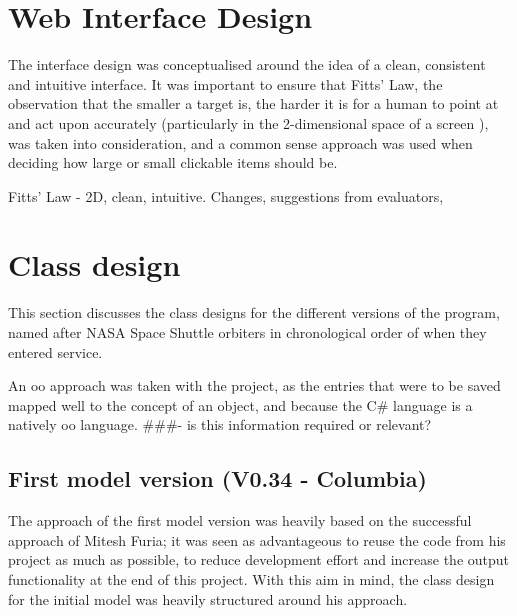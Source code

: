 \documentclass{l4proj}
\newcommand{\revisit}{\#\#\#}
\begin{document}
\section{Web Interface Design}
\label{uiDesign}
The interface design was conceptualised around the idea of a clean, consistent and intuitive interface.  It was important to ensure that Fitts' Law, the observation that the smaller a target is, the harder it is for a human to point at and act upon accurately \cite{fitts} (particularly in the 2-dimensional space of a screen \cite{fitts2d}), was taken into consideration, and a common sense approach was used when deciding how large or small clickable items should be.

Fitts' Law - 2D, clean, intuitive. Changes, suggestions from evaluators, 

\section{Class design}
This section discusses the class designs for the different versions of the program, named after NASA Space Shuttle orbiters in chronological order of when they entered service.

An \gls{oo} approach was taken with the project, as the entries that were to be saved mapped well to the concept of an object, and because the C\# language is a natively \gls{oo} language. \revisit - is this information required or relevant? %

\subsection{First model version (V0.34 - Columbia)}
The approach of the first model version was heavily based on the successful approach of Mitesh Furia; it was seen as advantageous to reuse the code from his project as much as possible, to reduce development effort and increase the output functionality at the end of this project.  With this aim in mind, the class design for the initial model was heavily structured around his approach.
\end{document}
